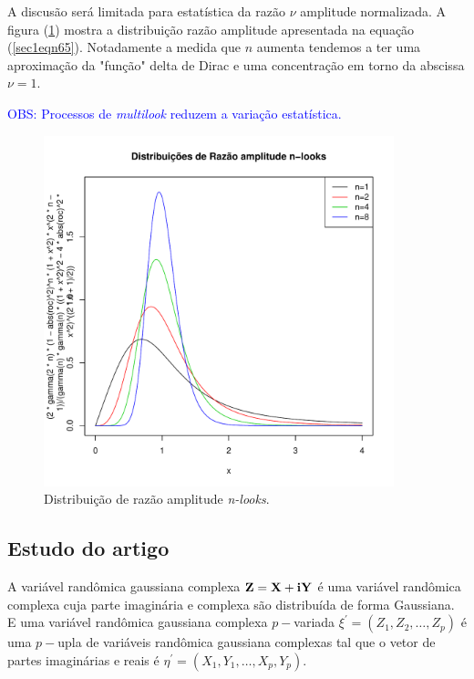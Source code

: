 \documentclass[12pt,a4paper]{article}
\begin{document}
A discusão será limitada para estatística da razão $\nu$ amplitude normalizada. A figura (\ref{sec1fig2}) mostra a distribuição razão amplitude apresentada na equação  (\ref{sec1eqn65}). Notadamente a medida que $n$ aumenta tendemos a ter uma aproximação da "função" delta de Dirac e uma concentração em torno da abscissa $\nu=1$.

\textcolor{blue}{OBS: Processos de {\it multilook} reduzem a variação estatística.}

\begin{figure}[!h]
\centering
\includegraphics[width=4.0in]{fig4_eq_33_lee_1994.pdf}
	\caption{Distribuição de razão amplitude {\it n-looks}.}
\label{sec1fig2}
\end{figure}


\subsection{Estudo do artigo  \cite{goodman1963}}


A variável randômica gaussiana complexa ${\bf Z=X+iY}$ é uma variável randômica complexa cuja parte imaginária e complexa são distribuída de forma Gaussiana.  E uma variável randômica gaussiana complexa $p-$variada $\xi^{'}=(Z_1,Z_2,\dots,Z_p)$ é uma $p-$upla  de variáveis randômica gaussiana complexas tal que o vetor de partes imaginárias e reais é $\eta^{'}=(X_1,Y_1,\dots,X_p,Y_p)$.
\end{document}
